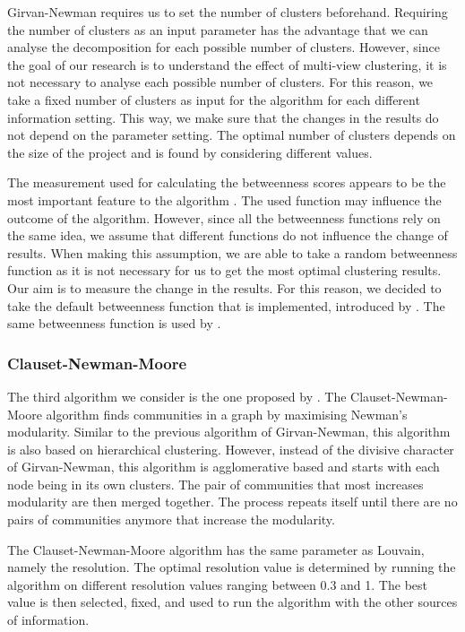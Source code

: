Girvan-Newman requires us to set the number of clusters beforehand. Requiring the number of clusters as an input parameter has the advantage that we can analyse the decomposition for each possible number of clusters. However, since the goal of our research is to understand the effect of multi-view clustering, it is not necessary to analyse each possible number of clusters. For this reason, we take a fixed number of clusters as input for the algorithm for each different information setting. This way, we make sure that the changes in the results do not depend on the parameter setting. The optimal number of clusters depends on the size of the project and is found by considering different values. \par
The measurement used for calculating the betweenness scores appears to be the most important feature to the algorithm \cite{newman2004finding}. The used function may influence the outcome of the algorithm. However, since all the betweenness functions rely on the same idea, we assume that different functions do not influence the change of results. When making this assumption, we are able to take a random betweenness function as it is not necessary for us to get the most optimal clustering results. Our aim is to measure the change in the results. For this reason, we decided to take the default betweenness function that is implemented, introduced by \citeauthor{brandes2001faster} \cite{brandes2001faster}. The same betweenness function is used by \citeauthor{matias2020determining} \cite{matias2020determining}.

\subsubsection{Clauset-Newman-Moore}
The third algorithm we consider is the one proposed by \citeauthor{clauset2004finding} \cite{clauset2004finding}. The Clauset-Newman-Moore algorithm finds communities in a graph by maximising Newman's \cite{newman2004finding} modularity. Similar to the previous algorithm of Girvan-Newman, this algorithm is also based on hierarchical clustering. However, instead of the divisive character of Girvan-Newman, this algorithm is agglomerative based and starts with each node being in its own clusters. The pair of communities that most increases modularity are then merged together. The process repeats itself until there are no pairs of communities anymore that increase the modularity. \par
The Clauset-Newman-Moore algorithm has the same parameter as Louvain, namely the resolution. The optimal resolution value is determined by running the algorithm on different resolution values ranging between 0.3 and 1. The best value is then selected, fixed, and used to run the algorithm with the other sources of information. 

